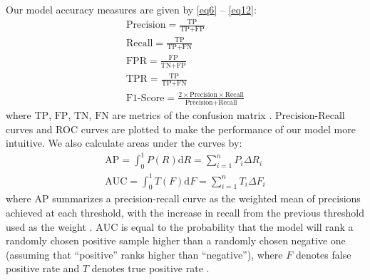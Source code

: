 \documentclass[journal,twoside]{IEEEtran}
\begin{document}
Our model accuracy measures are given by \eqref{eq6} -- \eqref{eq12}: 
\begin{gather}
    \text{Precision} = \displaystyle\frac{\text{TP}}{\text{TP} + \text{FP}}\label{eq6} \\
    \text{Recall} = \displaystyle\frac{\text{TP}}{\text{TP} + \text{FN}}\label{eq7} \\
    \text{FPR} = \displaystyle\frac{\text{FP}}{\text{TN} + \text{FP}}\label{eq8} \\
    \text{TPR} = \displaystyle\frac{\text{TP}}{\text{TP} + \text{FN}}\label{eq9} \\
    \text{F1-Score} = \displaystyle\frac{2 \times \text{Precision} \times \text{Recall}}{\text{Precision} + \text{Recall}}\label{eq10}
\end{gather}
where $\text{TP}$, $\text{FP}$, $\text{TN}$, $\text{FN}$ are metrics of the confusion matrix \cite{stehman1997selecting}. Precision-Recall curves and ROC curves \cite{powers2020evaluation}\cite{fawcett2006introduction} are plotted to make the performance of our model more intuitive. We also calculate areas under the curves by: 
\begin{gather}
    \text{AP} = \int_0^1 P(R)\text{d}R = \sum\limits_{i=1}^n P_i\Delta R_i\label{eq11} \\
    \text{AUC} = \int_0^1 T(F)\text{d}F = \sum\limits_{i=1}^n T_i\Delta F_i\label{eq12}
\end{gather}
where $\text{AP}$ summarizes a precision-recall curve as the weighted mean of precisions achieved at each threshold, with the increase in recall from the previous threshold used as the weight \cite{zhu2004recall}. $\text{AUC}$ is equal to the probability that the model will rank a randomly chosen positive sample higher than a randomly chosen negative one (assuming that ``positive'' ranks higher than ``negative''), where $F$ denotes false positive rate and $T$ denotes true positive rate \cite{fawcett2006introduction}. 
\end{document}
